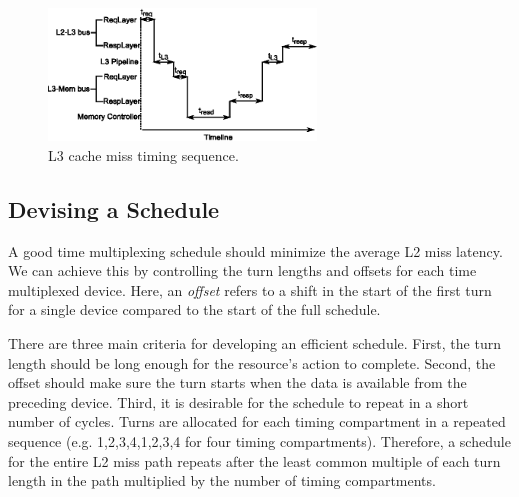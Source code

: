 \begin{figure}
    \begin{center}
        \includegraphics[width=2.8in]{figs/miss_timing.eps}
        \caption{L3 cache miss timing sequence.}
        \label{fig:miss_timing}
		\vspace{-0.2in}
    \end{center}
\end{figure}

\subsection{Devising a Schedule}
A good time multiplexing schedule should minimize the average L2 miss latency.
We can achieve this by controlling the turn lengths and offsets for each 
time multiplexed device. Here, an \emph{offset} refers to a shift in the start 
of the first turn for a single device compared to the start of the full 
schedule.

There are three main criteria for developing an efficient schedule.
First, the turn length should be long enough for the resource's action 
to complete. Second, the offset should make sure the turn starts when the data is 
available from the preceding device.
Third, it is desirable for the schedule to repeat in a short number of cycles.
Turns are allocated for each timing compartment in a repeated sequence
(e.g. 1,2,3,4,1,2,3,4 for four timing compartments). Therefore, a schedule
for the entire L2 miss path repeats after the least common multiple of each turn
length in the path multiplied by the number of timing compartments. 

